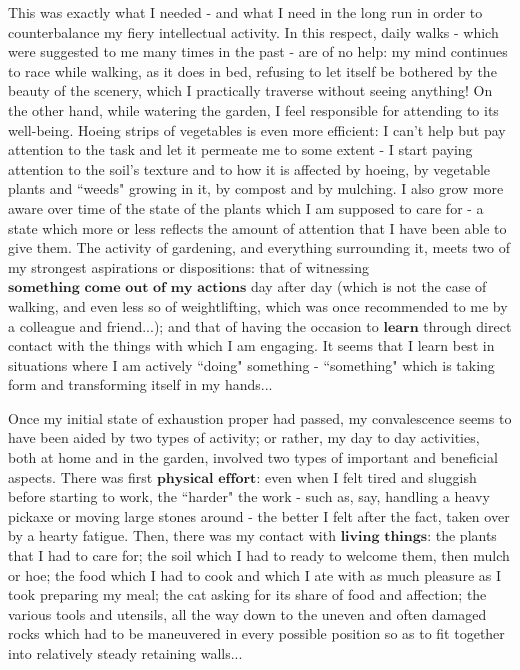 This was exactly what I needed - and what I need in the long run in order to counterbalance my fiery intellectual activity. In this respect, daily walks - which were suggested to me many times in the past - are of no help: my mind continues to race while walking, as it does in bed, refusing to let itself be bothered by the beauty of the scenery, which I practically traverse without seeing anything! On the other hand, while watering the garden, I feel responsible for attending to its well-being. Hoeing strips of vegetables is even more efficient: I can't help but pay attention to the task and let it permeate me to some extent - I start paying attention to the soil's texture and to how it is affected by hoeing, by vegetable plants and ``weeds" growing in it, by compost and by mulching. I also grow more aware over time of the state of the plants which I am supposed to care for - a state which more or less reflects the amount of attention that I have been able to give them. The activity of gardening, and everything surrounding it, meets two of my strongest aspirations or dispositions: that of witnessing $\textbf{something come out of my actions}$ day after day (which is not the case of walking, and even less so of weightlifting, which was once recommended to me by a colleague and friend...); and that of having the occasion to $\textbf{learn}$ through direct contact with the things with which I am engaging. It seems that I learn best in situations where I am actively ``doing" something - ``something" which is taking form and transforming itself in my hands...

Once my initial state of exhaustion proper had passed, my convalescence seems to have been aided by two types of activity; or rather, my day to day activities, both at home and in the garden, involved two types of important and beneficial aspects. There was first $\textbf{physical effort}$: even when I felt tired and sluggish before starting to work, the ``harder" the work - such as, say, handling a heavy pickaxe or moving large stones around - the better I felt after the fact, taken over by a hearty fatigue. Then, there was my contact with $\textbf{living things}$: the plants that I had to care for; the soil which I had to ready to welcome them, then mulch or hoe; the food which I had to cook and which I ate with as much pleasure as I took preparing my meal; the cat asking for its share of food and affection; the various tools and utensils, all the way down to the uneven and often damaged rocks which had to be maneuvered in every possible position so as to fit together into relatively steady retaining walls... 


